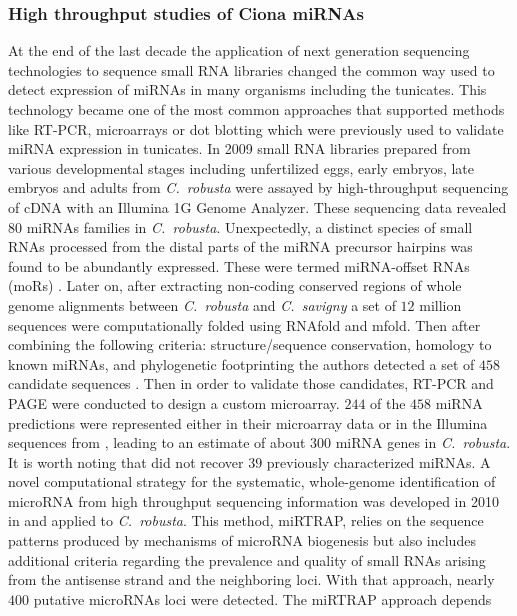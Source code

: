 \documentclass[graybox]{svmult}
\begin{document}
\subsubsection{High throughput studies of Ciona miRNAs} 

At the end of the last decade the application of next generation sequencing
technologies to sequence small RNA libraries changed the common way used to
detect expression of miRNAs in many organisms including the tunicates. This
technology became one of the most common approaches that supported
methods like RT-PCR, microarrays or dot blotting which were previously used
to validate miRNA expression in tunicates. In 2009 small RNA libraries
prepared from various developmental stages including unfertilized eggs,
early embryos, late embryos and adults from \textit{C.\ robusta} were
assayed by high-throughput sequencing of cDNA with an Illumina 1G Genome
Analyzer. These sequencing data revealed $80$ miRNAs families in
\textit{C.\ robusta}.  Unexpectedly, a distinct species of small RNAs
processed from the distal parts of the miRNA precursor hairpins was found
to be abundantly expressed. These were termed miRNA-offset RNAs (moRs)
\cite{Shi2009}.  Later on, after extracting non-coding conserved regions of
whole genome alignments between \textit{C.\ robusta} and \textit{C.\
  savigny} a set of $12$ million sequences were computationally folded
using RNAfold and mfold. Then after combining the following criteria:
structure/sequence conservation, homology to known miRNAs, and phylogenetic
footprinting the authors detected a set of $458$ candidate sequences
\cite{Keshavan2010}. Then in order to validate those candidates, RT-PCR and
PAGE were conducted to design a custom microarray.  $244$ of the $458$
miRNA predictions were represented either in their microarray data or in
the Illumina sequences from \cite{Shi2009}, leading to an estimate of about
$300$ miRNA genes in \textit{C.\ robusta}. It is worth noting that
\cite{Keshavan2010} did not recover $39$ previously characterized miRNAs.
A novel computational strategy for the systematic, whole-genome
identification of microRNA from high throughput sequencing information was
developed in 2010 in \cite{Hendrix2010} and applied to \textit{C.\
  robusta}. This method, miRTRAP, relies on the sequence patterns produced
by mechanisms of microRNA biogenesis but also includes additional criteria
regarding the prevalence and quality of small RNAs arising from the
antisense strand and the neighboring loci. With that approach, nearly $400$
putative microRNAs loci were detected. The miRTRAP approach depends
\end{document}
